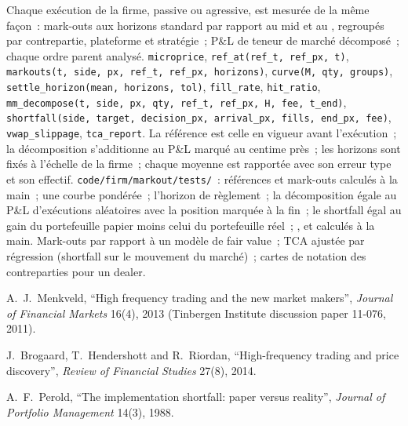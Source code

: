 \begin{build}
 Chaque exécution de la firme, passive ou agressive, est mesurée de la même façon~: mark-outs aux horizons standard par rapport au mid et au ,
regroupés par contrepartie, plateforme et stratégie~; P\&L de teneur de marché décomposé~; chaque ordre parent analysé.
 \texttt{microprice}, \texttt{ref\_at(ref\_t, ref\_px, t)}, \texttt{markouts(t, side, px, ref\_t, ref\_px, horizons)},
\texttt{curve(M, qty, groups)}, \texttt{settle\_horizon(mean, horizons, tol)}, \texttt{fill\_rate}, \texttt{hit\_ratio}, \texttt{mm\_decompose(t, side, px, qty, ref\_t, ref\_px, H, fee,
t\_end)}, \texttt{shortfall(side, target, decision\_px, arrival\_px, fills, end\_px, fee)}, \texttt{vwap\_slippage}, \texttt{tca\_report}.
 La référence est celle en vigueur avant l'exécution~; la décomposition s'additionne au P\&L marqué au centime près~; les horizons sont fixés à l'échelle de la firme~;
chaque moyenne est rapportée avec son erreur type et son effectif.
 \texttt{code/firm/markout/tests/}~: références et mark-outs calculés à la main~; une courbe pondérée~; l'horizon de règlement~; la décomposition égale au
P\&L d'exécutions aléatoires avec la position marquée à la fin~; le shortfall égal au gain du portefeuille papier moins celui du portefeuille réel~; ,  et
 calculés à la main.
 Mark-outs par rapport à un modèle de fair value~; TCA ajustée par régression (shortfall sur le mouvement du marché)~; cartes de notation des contreparties pour un dealer.
\end{build}

\begin{omsources}
\item A.~J.~Menkveld, ``High frequency trading and the new market makers'', \emph{Journal of Financial Markets} 16(4), 2013 (Tinbergen Institute discussion
paper 11-076, 2011).
\item J.~Brogaard, T.~Hendershott and R.~Riordan, ``High-frequency trading and price discovery'', \emph{Review of Financial Studies} 27(8), 2014.
\item A.~F.~Perold, ``The implementation shortfall: paper versus reality'', \emph{Journal of Portfolio Management} 14(3), 1988.
\end{omsources}

